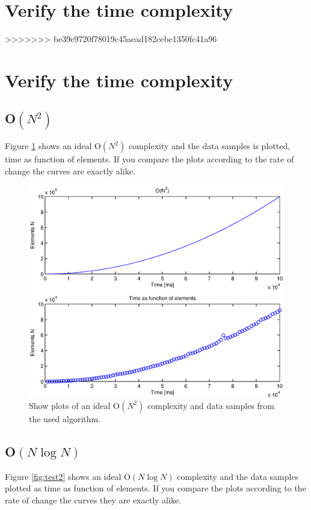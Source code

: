 \section{Verify the time complexity}


>>>>>>> be39e9720f78019c45aead182cebe1350fc41a96


\newpage
\section{Verify the time complexity}

\subsection{O\(\left( { N }^{ 2 } \right)\)}
Figure \ref{fig:test1} shows an ideal O\(\left( { N }^{ 2 } \right)\) complexity and the data samples is plotted, time as function of elements. If you compare the plots according to the rate of change the curves are exactly alike. 


\begin{figure}[th!]
\centering
\includegraphics[width=1\textwidth]{./graphics/test1.eps}
\caption{Show plots of an ideal O\(\left( { N }^{ 2 } \right)\) complexity and data samples from the used algorithm.}

\label{fig:test1}
\end{figure}
\newpage


\subsection{O\(\left( N\log {N }  \right) \)}
Figure \ref{fig:test2} shows an ideal O\(\left( N\log {N }  \right) \) complexity and the data samples plotted as time as function of elements. If you compare the plots according to the rate of change the curves they are exactly alike. 




